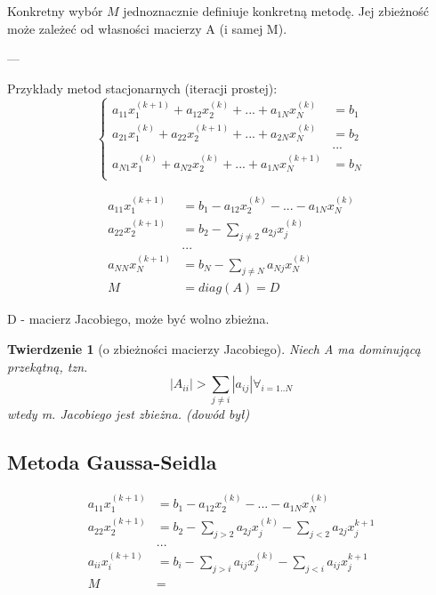 \documentclass[hidelinks,a4paper,fleqn,oneside]{book}
\newtheorem{twierdz}{Twierdzenie}
\begin{document}
Konkretny wybór $M$ jednoznacznie definiuje konkretną metodę. Jej zbieżność może zależeć od własności macierzy A (i samej M).

---

Przykłady metod stacjonarnych (iteracji prostej):
\[
	\left\{ \begin{array}{ll}
	a_{11}x_1^{(k+1)} + a_{12}x_2^{(k)} + ... + a_{1N}x_N^{(k)} & = b_1 \\
	a_{21}x_1^{(k)} + a_{22}x_2^{(k+1)} + ... + a_{2N}x_N^{(k)} & = b_2 \\
	& ... \\
	a_{N1}x_1^{(k)} + a_{N2}x_2^{(k)} + ... + a_{1N}x_N^{(k+1)} & = b_N \\
	\end{array} \right.
\]

\[
	\begin{array}{ll}
		a_{11}x_1^{(k+1)} & = b_1 - a_{12}x_2^{(k)} - ... - a_{1N}x_N^{(k)} \\
		a_{22}x_2^{(k+1)} & = b_2 - \sum_{j\neq 2} a_{2j}x_j^{(k)}          \\
		                  & ...                                             \\
		a_{NN}x_N^{(k+1)} & = b_N - \sum_{j\neq N} a_{Nj}x_N^{(k)}          \\
		M                 & = diag(A) = D                                   
	\end{array}
\]

D - macierz Jacobiego, może być wolno zbieżna.

\begin{twierdz}[o zbieżności macierzy Jacobiego] Niech A ma dominującą przekątną, tzn.
	\[
		|A_{ii}| > \sum_{j \neq i}|a_{ij}| \forall_{i=1..N}
	\]
	wtedy m. Jacobiego jest zbieżna. (dowód był)
\end{twierdz}
 

\subsection{Metoda Gaussa-Seidla} 
\[
	\begin{array}{ll}
		a_{11}x_1^{(k+1)} & = b_1 - a_{12}x_2^{(k)} - ... - a_{1N}x_N^{(k)}                     \\
		a_{22}x_2^{(k+1)} & = b_2 - \sum_{j > 2} a_{2j}x_j^{(k)} - \sum_{j < 2} a_{2j}x_j^{k+1} \\
		                  & ...                                                                 \\
		a_{ii}x_i^{(k+1)} & = b_i - \sum_{j > i} a_{ij}x_j^{(k)} - \sum_{j < i} a_{ij}x_j^{k+1} \\
		M                 & =                                                                   
	\end{array}
\]
 
\end{document}
